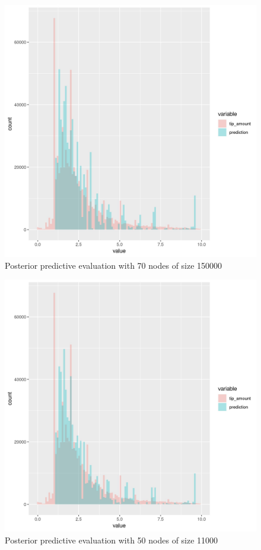 \documentclass[11pt]{article}
\begin{document}
\begin{figure}[htbp]
\centering
\includegraphics[width=.9\linewidth]{./plots/rfNodesize1e+05Maxnode70PosteriorPredictive.jpg}
\caption{\label{fig:org9b78f88}
Posterior predictive evaluation with 70 nodes of size 150000}
\end{figure}

\begin{figure}[htbp]
\centering
\includegraphics[width=.9\linewidth]{./plots/rfNodesize110000Maxnode50PosteriorPredictive.jpg}
\caption{\label{fig:orgdc0aa35}
Posterior predictive evaluation with 50 nodes of size 11000}
\end{figure}
\end{document}
